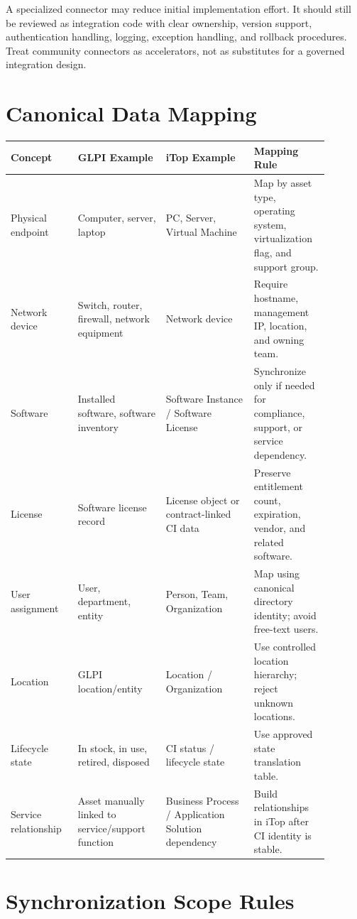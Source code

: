 \documentclass[11pt]{article}
\begin{document}
A specialized connector may reduce initial implementation effort. It should still be reviewed as integration code with clear ownership, version support, authentication handling, logging, exception handling, and rollback procedures. Treat community connectors as accelerators, not as substitutes for a governed integration design.

\section{Canonical Data Mapping}

\begin{longtable}{p{0.19\linewidth}p{0.25\linewidth}p{0.25\linewidth}p{0.20\linewidth}}
\toprule
\rowcolor{LightBlue}\textbf{Concept} & \textbf{GLPI Example} & \textbf{iTop Example} & \textbf{Mapping Rule} \\
\midrule
Physical endpoint & Computer, server, laptop & PC, Server, Virtual Machine & Map by asset type, operating system, virtualization flag, and support group. \\
Network device & Switch, router, firewall, network equipment & Network device & Require hostname, management IP, location, and owning team. \\
Software & Installed software, software inventory & Software Instance / Software License & Synchronize only if needed for compliance, support, or service dependency. \\
License & Software license record & License object or contract-linked CI data & Preserve entitlement count, expiration, vendor, and related software. \\
User assignment & User, department, entity & Person, Team, Organization & Map using canonical directory identity; avoid free-text users. \\
Location & GLPI location/entity & Location / Organization & Use controlled location hierarchy; reject unknown locations. \\
Lifecycle state & In stock, in use, retired, disposed & CI status / lifecycle state & Use approved state translation table. \\
Service relationship & Asset manually linked to service/support function & Business Process / Application Solution dependency & Build relationships in iTop after CI identity is stable. \\
\bottomrule
\end{longtable}

\section{Synchronization Scope Rules}
\end{document}
